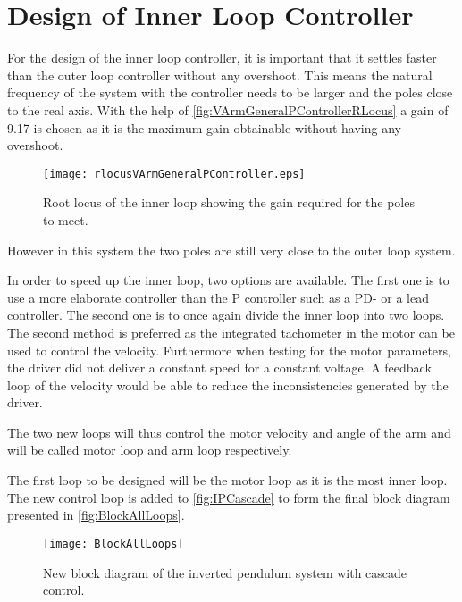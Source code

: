 \section{Design of Inner Loop Controller}
For the design of the inner loop controller, it is important that it settles faster than the outer loop controller without any overshoot. This means the natural frequency of the system with the controller needs to be larger and the poles close to the real axis. With the help of \autoref{fig:VArmGeneralPControllerRLocus} a gain of 9.17 is chosen as it is the maximum gain obtainable without having any overshoot.
\begin{figure} [htbp] 
	\centering
	\texttt{[image: rlocusVArmGeneralPController.eps]}
	\caption{Root locus of the inner loop showing the gain required for the poles to meet.}
	\label{fig:VArmGeneralPControllerRLocus}
\end{figure}

However in this system the two poles are still very close to the outer loop system. 

In order to speed up the inner loop, two options are available. The first one is to use a more elaborate controller than the P controller such as a PD- or a lead controller. The second one is to once again divide the inner loop into two loops. The second method is preferred as the integrated tachometer in the motor can be used to control the velocity. Furthermore when testing for the motor parameters, the driver did not deliver a constant speed for a constant voltage. A feedback loop of the velocity would be able to reduce the inconsistencies generated by the driver. 

The two new loops will thus control the motor velocity and angle of the arm and will be called motor loop and arm loop respectively.

The first loop to be designed will be the motor loop as it is the most inner loop. The new control loop is added to \autoref{fig:IPCascade} to form the final block diagram presented in \autoref{fig:BlockAllLoops}.
\begin{figure}[htbp]
	\centering
	\texttt{[image: BlockAllLoops]}
	\caption{New block diagram of the inverted pendulum system with cascade control.}
	\label{fig:BlockAllLoops}
\end{figure}


